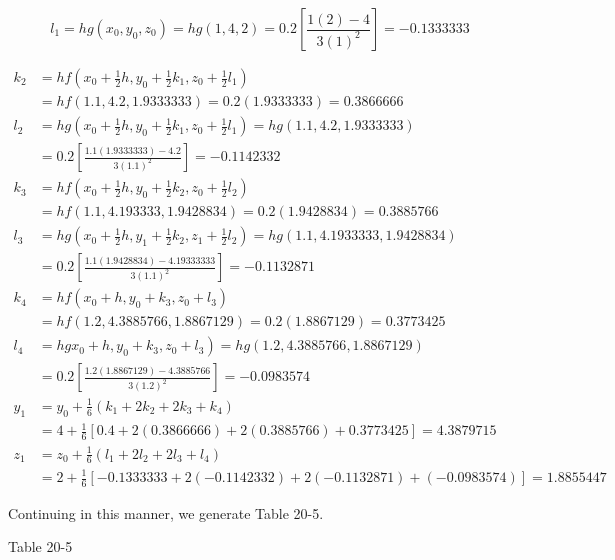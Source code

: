 \documentclass[10pt]{article}
\begin{document}
$$
l_{1}=h g\left(x_{0}, y_{0}, z_{0}\right)=h g(1,4,2)=0.2\left[\frac{1(2)-4}{3(1)^{2}}\right]=-0.1333333
$$

$$
\begin{aligned}
k_{2} & =h f\left(x_{0}+\frac{1}{2} h, y_{0}+\frac{1}{2} k_{1}, z_{0}+\frac{1}{2} l_{1}\right) \\
& =h f(1.1,4.2,1.9333333)=0.2(1.9333333)=0.3866666 \\
l_{2} & =h g\left(x_{0}+\frac{1}{2} h, y_{0}+\frac{1}{2} k_{1}, z_{0}+\frac{1}{2} l_{1}\right)=h g(1.1,4.2,1.9333333) \\
& =0.2\left[\frac{1.1(1.9333333)-4.2}{3(1.1)^{2}}\right]=-0.1142332 \\
k_{3} & =h f\left(x_{0}+\frac{1}{2} h, y_{0}+\frac{1}{2} k_{2}, z_{0}+\frac{1}{2} l_{2}\right) \\
& =h f(1.1,4.193333,1.9428834)=0.2(1.9428834)=0.3885766 \\
l_{3} & =h g\left(x_{0}+\frac{1}{2} h, y_{1}+\frac{1}{2} k_{2}, z_{1}+\frac{1}{2} l_{2}\right)=h g(1.1,4.1933333,1.9428834) \\
& =0.2\left[\frac{1.1(1.9428834)-4.19333333}{3(1.1)^{2}}\right]=-0.1132871 \\
k_{4} & =h f\left(x_{0}+h, y_{0}+k_{3}, z_{0}+l_{3}\right) \\
& =h f(1.2,4.3885766,1.8867129)=0.2(1.8867129)=0.3773425 \\
l_{4} & \left.=h g x_{0}+h, y_{0}+k_{3}, z_{0}+l_{3}\right)=h g(1.2,4.3885766,1.8867129) \\
& =0.2\left[\frac{1.2(1.8867129)-4.3885766}{3(1.2)^{2}}\right]=-0.0983574 \\
y_{1} & =y_{0}+\frac{1}{6}\left(k_{1}+2 k_{2}+2 k_{3}+k_{4}\right) \\
& =4+\frac{1}{6}[0.4+2(0.3866666)+2(0.3885766)+0.3773425]=4.3879715 \\
z_{1} & =z_{0}+\frac{1}{6}\left(l_{1}+2 l_{2}+2 l_{3}+l_{4}\right) \\
& =2+\frac{1}{6}[-0.1333333+2(-0.1142332)+2(-0.1132871)+(-0.0983574)]=1.8855447
\end{aligned}
$$

Continuing in this manner, we generate Table 20-5.

Table 20-5
\end{document}
